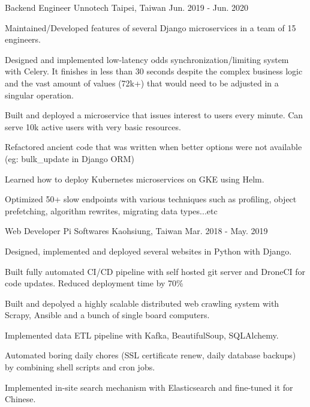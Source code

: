 \begin{cventries}
  \cventry
    {Backend Engineer} %
    {Unnotech} %
    {Taipei, Taiwan} %
    {Jun. 2019 - Jun. 2020} %
    {
      \begin{cvitems} %
        \item {Maintained/Developed features of several Django microservices in a team of 15 engineers. }
        \item {Designed and implemented low-latency odds synchronization/limiting system with Celery. It finishes in less than 30 seconds despite the complex business logic and the vast amount of values (72k+) that would need to be adjusted in a singular operation. }
        \item {Built and deployed a microservice that issues interest to users every minute. Can serve 10k active users with very basic resources. }
        \item {Refactored ancient code that was written when better options were not available (eg: bulk\_update in Django ORM)}
        \item {Learned how to deploy Kubernetes microservices on GKE using Helm. }
        \item {Optimized 50+ slow endpoints with various techniques such as profiling, object prefetching, algorithm rewrites, migrating data types...etc }
      \end{cvitems}
    }

  \cventry
    {Web Developer} %
    {Pi Softwares} %
    {Kaohsiung, Taiwan} %
    {Mar. 2018 - May. 2019} %
    {
      \begin{cvitems} %
        \item {Designed, implemented and deployed several websites in Python with Django.}
        \item {Built fully automated CI/CD pipeline with self hosted git server and DroneCI for code updates. Reduced deployment time by 70\% }
        \item {Built and depolyed a highly scalable distributed web crawling system with Scrapy, Ansible and a bunch of single board computers.}
        \item {Implemented data ETL pipeline with Kafka, BeautifulSoup, SQLAlchemy.}
        \item {Automated boring daily chores (SSL certificate renew, daily database backups) by combining shell scripts and cron jobs. }
        \item {Implemented in-site search mechanism with Elasticsearch and fine-tuned it for Chinese.}
      \end{cvitems}
    }

\end{cventries}
